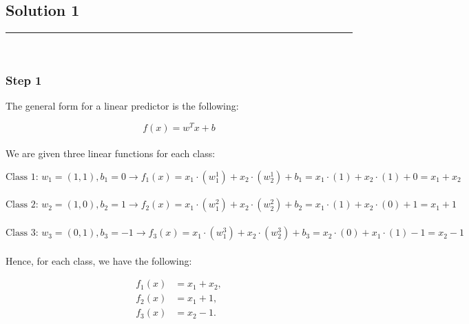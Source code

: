 \documentclass{article}
\begin{document}
\pagestyle{fancy}

\subsection*{Solution 1}
\noindent\rule{\textwidth}{0.4pt}\\

\subsubsection*{Step 1}
\parbox{\textwidth}{
The general form for a linear predictor is the following:

$$f(x) = w^{T}x + b$$\\

We are given three linear functions for each class:

$$\text{Class 1: } w_1=(1,1), b_1 = 0 \rightarrow f_{1}(x) = x_{1}\cdot(w^1_1)+x_{2}\cdot(w^1_2)+b_1 = x_{1}\cdot(1)+x_{2}\cdot(1)+0 = x_{1} + x_{2} $$\\
$$\text{Class 2: } w_2=(1,0), b_2 = 1 \rightarrow f_{2}(x) = x_{1}\cdot(w^2_1)+x_{2}\cdot(w^2_2)+b_2 = x_{1}\cdot(1)+x_{2}\cdot(0)+1 = x_{1} + 1 $$\\
$$\text{Class 3: } w_3=(0,1), b_3 = -1 \rightarrow f_{3}(x) = x_{1}\cdot(w^3_1)+x_{2}\cdot(w^3_2)+b_3 = x_{2}\cdot(0)+x_{1}\cdot(1)-1 = x_{2} - 1$$\\

Hence, for each class, we have the following:

$$
\begin{aligned}
f_{1}(x) &= x_{1}+x_{2},\\
f_{2}(x) &= x_{1}+1,\\
f_{3}(x) &= x_{2}-1.
\end{aligned}
$$
}
\end{document}
